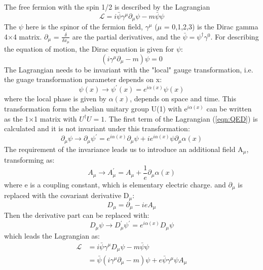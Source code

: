 The free fermion with the spin 1/2 is described by the Lagrangian\\
\begin{equation}
\label{eqn:QED}
\mathcal{L}=i \bar{\psi} \gamma^{\mu} \partial_{\mu} \psi-m \bar{\psi} \psi
\end{equation}
The $\psi$ here is the spinor of the fermion field, $\gamma^{\mu}$  ($\mu$ = 0,1,2,3) is the Dirac gamma 4$\times$4 matrix. $\partial_{\mu}$ = $\frac{\delta}{\delta x_{\mu}}$ are the partial derivatives, and the $\bar{\psi}=\psi^{\dagger} \gamma^{0}$.
For describing the equation of motion, the Dirac equation is given for $\psi$:
\begin{equation}
\left(i \gamma^{\mu} \partial_{\mu}-m\right) \psi=0
\end{equation}
The Lagrangian needs to be invariant with the "local" gauge transformation, i.e. the guage transformation parameter depends on x:
\begin{equation}
\psi(x) \rightarrow \psi^{\prime}(x)=e^{i \alpha(x)} \psi(x)
\end{equation}
where the local phase is given by $\alpha(x)$, depends on space and time. 
This transformation form the abelian unitary group U(1) with e$^{i\alpha(x)}$ can be written as the 1$\times$1 matrix with $U^{\dagger} U=1$.
The first term of the Lagrangian (\ref{eqn:QED}) is calculated and it is not invariant under this transformation:
\begin{equation}
\partial_{\mu} \psi \rightarrow \partial_{\mu} \psi^{\prime}=e^{i \alpha(x)} \partial_{\mu} \psi+i e^{i \alpha(x)} \psi \partial_{\mu} \alpha(x)
\end{equation}
The requirement of the invariance leads us to introduce an additional field A$_\mu$, transforming as:
\begin{equation}
A_{\mu} \rightarrow A_{\mu}^{\prime}=A_{\mu}+\frac{1}{e} \partial_{\mu} \alpha(x)
\end{equation}
where e is a coupling constant, which is elementary electric charge. 
and $\partial_{\mu}$ is replaced with the covariant derivative D$_\mu$:
\begin{equation}
D_{\mu}=\partial_{\mu}-i e A_{\mu}
\end{equation}
Then the derivative part can be replaced with:
\begin{equation}
D_{\mu} \psi \rightarrow D_{\mu}^{\prime} \psi^{\prime}=e^{i \alpha(x)} D_{\mu} \psi
\end{equation}
which leads the Lagrangian as:
\begin{equation}
\begin{aligned}
\mathcal{L} &=i \bar{\psi} \gamma^{\mu} D_{\mu} \psi-m \bar{\psi} \psi \\
&=\bar{\psi}\left(i \gamma^{\mu} \partial_{\mu}-m\right) \psi+e \bar{\psi} \gamma^{\mu} \psi A_{\mu}
\end{aligned}
\end{equation}
